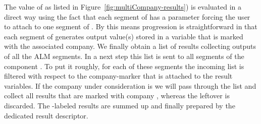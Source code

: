 The value of  as listed in Figure~\ref{fig:multiCompany-results}) is
evaluated in a direct way using the fact that each segment of  has a
parameter  forcing the user to attach to one segment of .
By this means progression is straightforward in that each segment of 
generates output value(s) stored in a variable that is marked with the associated company.
We finally obtain a list of results collecting outputs of all the ALM segments.
In a next step this list is sent to all segments of the component .
To put it roughly, for each of these segments the incoming list is filtered with respect to
the company-marker that is attached to the result variables.
If the company under consideration is  we will pass through the list and
collect all results that are marked with company , whereas the leftover is
discarded.  The -labeled results are summed up and finally prepared by the
dedicated result descriptor.

